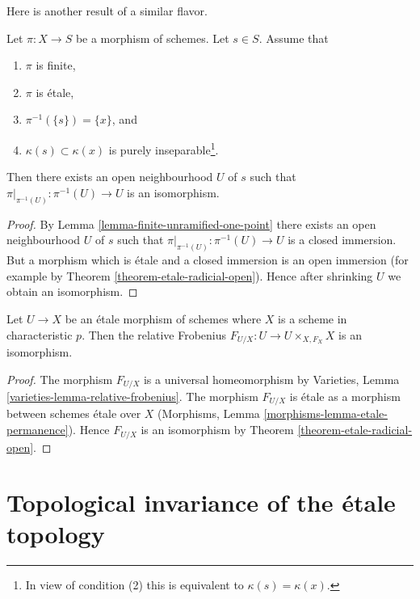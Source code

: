 \noindent
Here is another result of a similar flavor.

\begin{lemma}
\label{lemma-finite-etale-one-point}
Let $\pi : X \to S$ be a morphism of schemes. Let $s \in S$.
Assume that
\begin{enumerate}
\item $\pi$ is finite,
\item $\pi$ is \'etale,
\item $\pi^{-1}(\{s\}) = \{x\}$, and
\item $\kappa(s) \subset \kappa(x)$ is purely
inseparable\footnote{In view of condition (2)
this is equivalent to $\kappa(s) = \kappa(x)$.}.
\end{enumerate}
Then there exists an open neighbourhood $U$ of $s$ such that
$\pi|_{\pi^{-1}(U)} : \pi^{-1}(U) \to U$ is an isomorphism.
\end{lemma}

\begin{proof}
By
Lemma \ref{lemma-finite-unramified-one-point}
there exists an open neighbourhood $U$ of $s$ such that
$\pi|_{\pi^{-1}(U)} : \pi^{-1}(U) \to U$ is a closed immersion.
But a morphism which is \'etale and a closed immersion is an
open immersion (for example by
Theorem \ref{theorem-etale-radicial-open}).
Hence after shrinking $U$ we obtain an isomorphism.
\end{proof}

\begin{lemma}
\label{lemma-relative-frobenius-etale}
Let $U \to X$ be an \'etale morphism of schemes
where $X$ is a scheme in characteristic $p$.
Then the relative Frobenius $F_{U/X} : U \to U \times_{X, F_X} X$
is an isomorphism.
\end{lemma}

\begin{proof}
The morphism $F_{U/X}$ is a universal homeomorphism by
Varieties, Lemma \ref{varieties-lemma-relative-frobenius}.
The morphism $F_{U/X}$ is \'etale as a
morphism between schemes \'etale over $X$
(Morphisms, Lemma \ref{morphisms-lemma-etale-permanence}).
Hence $F_{U/X}$ is an isomorphism by
Theorem \ref{theorem-etale-radicial-open}.
\end{proof}






\section{Topological invariance of the \'etale topology}
\label{section-topological-invariance}

